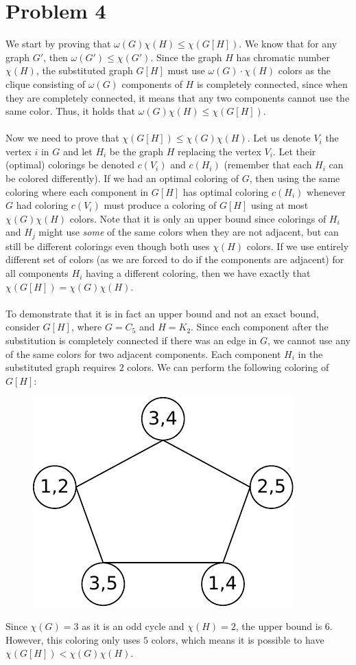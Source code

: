 \documentclass[a4paper]{article}
\begin{document}
\section{Problem 4}
We start by proving that $\omega(G)\chi(H)\leq \chi(G[H])$. We know that for any graph $G'$, then $\omega(G')\leq \chi(G')$. Since the graph $H$ has chromatic number $\chi(H)$, the substituted graph $G[H]$ must use $\omega(G)\cdot \chi(H)$ colors as the clique consisting of $\omega(G)$ components of $H$ is completely connected, since when they are completely connected, it means that any two components cannot use the same color. Thus, it holds that $\omega(G)\chi(H)\leq \chi(G[H])$. \\
\\
Now we need to prove that $\chi(G[H])\leq \chi(G)\chi(H)$. Let us denote $V_i$ the vertex $i$ in $G$ and let $H_i$ be the graph $H$ replacing the vertex $V_i$. Let their (optimal) colorings be denoted $c(V_i)$ and $c(H_i)$ (remember that each $H_i$ can be colored differently). If we had an optimal coloring of $G$, then using the same coloring where each component in $G[H]$ has optimal coloring $c(H_i)$ whenever $G$ had coloring $c(V_i)$ must produce a coloring of $G[H]$ using at most $\chi(G)\chi(H)$ colors. Note that it is only an upper bound since colorings of $H_i$ and $H_j$ might use \textit{some} of the same colors when they are not adjacent, but can still be different colorings even though both uses $\chi(H)$ colors. If we use entirely different set of colors (as we are forced to do if the components are adjacent) for all components $H_i$ having a different coloring, then we have exactly that $\chi(G[H])=\chi(G)\chi(H)$. \\
\\
To demonstrate that it is in fact an upper bound and not an exact bound, consider $G[H]$, where $G=C_5$ and $H=K_2$. Since each component after the substitution is completely connected if there was an edge in $G$, we cannot use any of the same colors for two adjacent components. Each component $H_i$ in the substituted graph requires $2$ colors. We can perform the following coloring of $G[H]$:
\begin{figure}[H]
  \centering
  \includegraphics[scale=0.9]{fig2.pdf}
\end{figure}
Since $\chi(G)=3$ as it is an odd cycle and $\chi(H)=2$, the upper bound is $6$. However, this coloring only uses $5$ colors, which means it is possible to have $\chi(G[H])<\chi(G)\chi(H)$.
\end{document}
